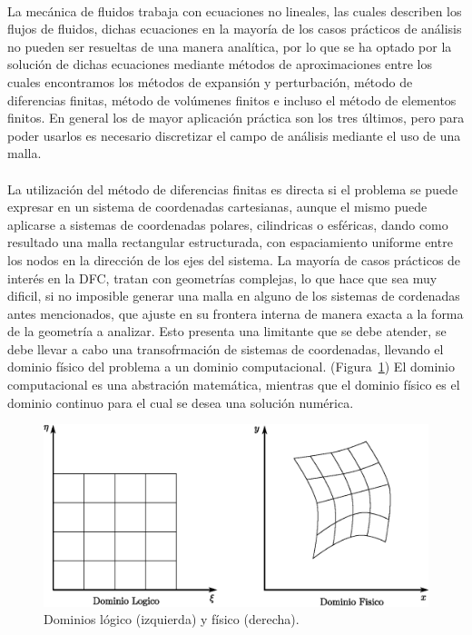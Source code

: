 \documentclass[letterpaper, openright, 12pt]{book}
\begin{document}
    \paragraph*{}
    La mecánica de fluidos trabaja con ecuaciones no lineales, las cuales
    describen los flujos de fluidos, dichas ecuaciones en la mayoría de los
    casos prácticos de análisis no pueden ser resueltas de una manera
    analítica, por lo que se ha optado por la solución de dichas ecuaciones
    mediante métodos de aproximaciones entre los cuales encontramos los métodos
    de expansión y perturbación, método de diferencias finitas, método de
    volúmenes finitos e incluso el método de elementos finitos. En general los
    de mayor aplicación práctica son los tres últimos, pero para poder usarlos
    es necesario discretizar el campo de análisis mediante el uso de una
    malla.\cite{thompsonhandbook}

    \paragraph*{}
    La utilización del método de diferencias finitas es directa si el problema
    se puede expresar en un sistema de coordenadas cartesianas, aunque el
    mismo puede aplicarse a sistemas de coordenadas polares, cilindricas o
    esféricas, dando como resultado una malla rectangular estructurada, con
    espaciamiento uniforme entre los nodos en la dirección de los ejes del
    sistema. La mayoría de casos prácticos de interés en la DFC, tratan con
    geometrías complejas, lo que hace que sea muy dificil, si no imposible
    generar una malla en alguno de los sistemas de cordenadas antes
    mencionados, que ajuste en su frontera interna de manera exacta a la
    forma de la geometría a analizar. Esto presenta una limitante que se debe
    atender, se debe llevar a cabo una transofrmación de sistemas de
    coordenadas, llevando el dominio físico del problema a un dominio
    computacional. (Figura~\ref{fig:dominios}) El dominio computacional es
    una abstración matemática, mientras que el dominio físico es el dominio
    continuo para el cual se desea una solución numérica.
    \begin{figure}[htbp!]
        \centering
        \includegraphics[keepaspectratio, width=170mm]{./img/dominios}
        \caption[Dominios lógico y físico]{Dominios lógico (izquierda) y
        físico (derecha). \cite{numerical-grid}}
        \label{fig:dominios}
    \end{figure}
\end{document}
